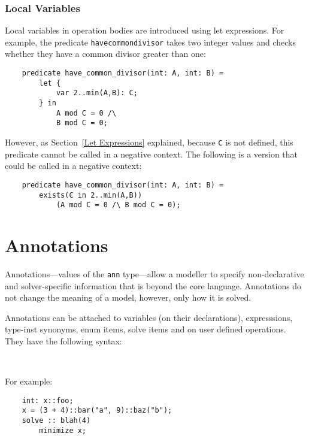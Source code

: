 \documentclass[10pt]{scrartcl}
\begin{document}
\subsubsection{Local Variables}

Local variables in operation bodies are introduced using let expressions.
For example, the predicate \texttt{have\n{}common\n{}divisor} takes two
integer values and checks whether they have a common divisor greater than
one:
\begin{verbatim}
    predicate have_common_divisor(int: A, int: B) =
        let {
            var 2..min(A,B): C;
        } in
            A mod C = 0 /\
            B mod C = 0;
\end{verbatim}

However, as Section~\ref{Let Expressions} explained, because \texttt{C} is
not defined, this predicate cannot be called in a negative context.  The
following is a version that could be called in a negative context:
\begin{verbatim}
    predicate have_common_divisor(int: A, int: B) =
        exists(C in 2..min(A,B))
            (A mod C = 0 /\ B mod C = 0);
\end{verbatim}


\section{Annotations}
  \label{Annotations}
Annotations---values of the \texttt{ann} type---allow a modeller to specify
non-declarative and solver-specific information that is beyond the core
language.  Annotations do not change the meaning of a model, however, only
how it is solved.

Annotations can be attached to variables (on their declarations),
expresssions, type-inst synonyms, enum items, solve items and on user
defined operations.
They have the following syntax:
\begin{productions}
    \RuleAnnotations \\
    \RuleAnnotation
\end{productions}
For example:
\begin{verbatim}
    int: x::foo;
    x = (3 + 4)::bar("a", 9)::baz("b");
    solve :: blah(4)
        minimize x;
\end{verbatim}
\end{document}
